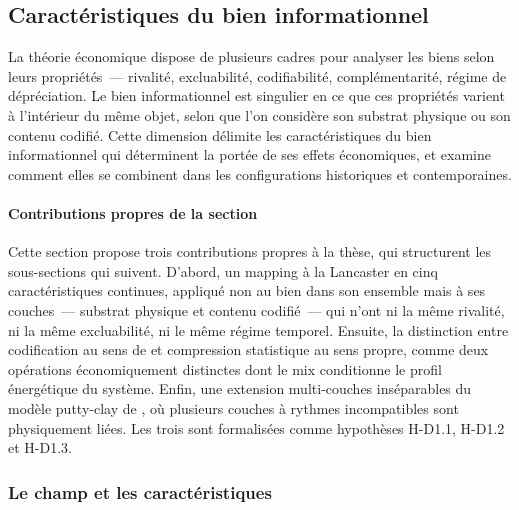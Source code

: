 \clearpage
\subsection{Caractéristiques du bien informationnel}\label{sec:d1-bien}

La théorie économique dispose de plusieurs cadres pour analyser les biens selon leurs propriétés~--- rivalité, excluabilité, codifiabilité, complémentarité, régime de dépréciation. Le bien informationnel est singulier en ce que ces propriétés varient à l'intérieur du même objet, selon que l'on considère son substrat physique ou son contenu codifié. Cette dimension délimite les caractéristiques du bien informationnel qui déterminent la portée de ses effets économiques, et examine comment elles se combinent dans les configurations historiques et contemporaines.

\paragraph{Contributions propres de la section}
Cette section propose trois contributions propres à la thèse, qui structurent les sous-sections qui suivent. D'abord, un mapping à la Lancaster en cinq caractéristiques continues, appliqué non au bien dans son ensemble mais à ses couches~--- substrat physique et contenu codifié~--- qui n'ont ni la même rivalité, ni la même excluabilité, ni le même régime temporel. Ensuite, la distinction entre codification au sens de \textcite{cowan_explicit_2000} et compression statistique au sens propre, comme deux opérations économiquement distinctes dont le mix conditionne le profil énergétique du système. Enfin, une extension multi-couches inséparables du modèle putty-clay de \textcite{johansen_substitution_1959}, où plusieurs couches à rythmes incompatibles sont physiquement liées. Les trois sont formalisées comme hypothèses H-D1.1, H-D1.2 et H-D1.3.

\subsubsection{Le champ et les caractéristiques}

